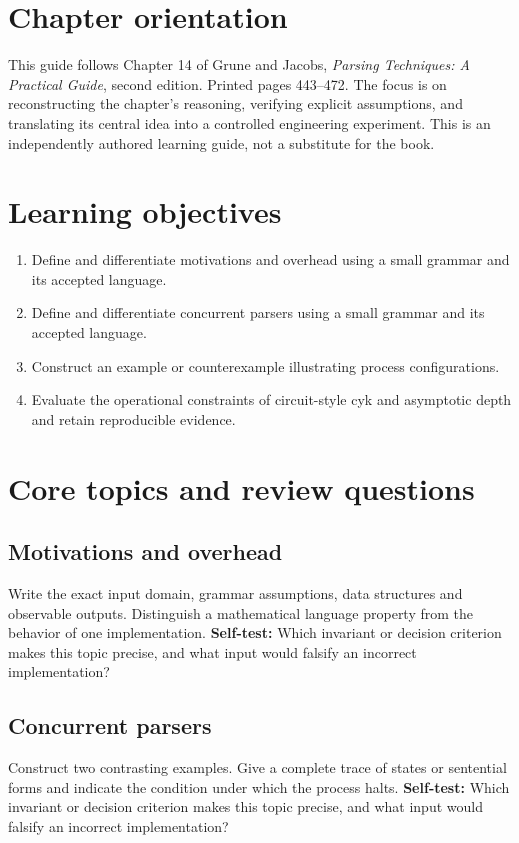 \documentclass[11pt,letterpaper]{article}
\begin{document}
\makedoctitle\makedocsummary
\tableofcontents\clearpage
\section{Chapter orientation}
This guide follows Chapter 14 of Grune and Jacobs, \emph{Parsing Techniques: A Practical Guide}, second edition. Printed pages 443--472. The focus is on reconstructing the chapter's reasoning, verifying explicit assumptions, and translating its central idea into a controlled engineering experiment. This is an independently authored learning guide, not a substitute for the book.
\section{Learning objectives}
\begin{enumerate}
\item Define and differentiate motivations and overhead using a small grammar and its accepted language.
\item Define and differentiate concurrent parsers using a small grammar and its accepted language.
\item Construct an example or counterexample illustrating process configurations.
\item Evaluate the operational constraints of circuit-style cyk and asymptotic depth and retain reproducible evidence.
\end{enumerate}
\section{Core topics and review questions}
\subsection{Motivations and overhead}
Write the exact input domain, grammar assumptions, data structures and observable outputs. Distinguish a mathematical language property from the behavior of one implementation.
\textbf{Self-test:} Which invariant or decision criterion makes this topic precise, and what input would falsify an incorrect implementation?
\subsection{Concurrent parsers}
Construct two contrasting examples. Give a complete trace of states or sentential forms and indicate the condition under which the process halts.
\textbf{Self-test:} Which invariant or decision criterion makes this topic precise, and what input would falsify an incorrect implementation?
\end{document}
